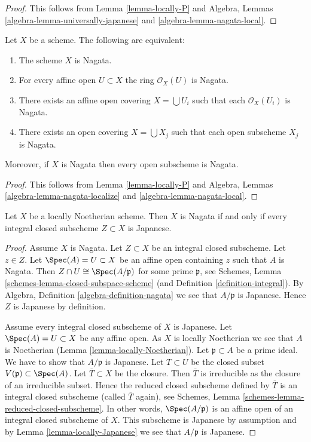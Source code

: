 \begin{proof}
This follows from Lemma \ref{lemma-locally-P} and
Algebra, Lemmas \ref{algebra-lemma-universally-japanese} and
\ref{algebra-lemma-nagata-local}.
\end{proof}

\begin{lemma}
\label{lemma-locally-nagata}
Let $X$ be a scheme. The following are equivalent:
\begin{enumerate}
\item The scheme $X$ is Nagata.
\item For every affine open $U \subset X$ the ring $\mathcal{O}_X(U)$
is Nagata.
\item There exists an affine open covering $X = \bigcup U_i$
such that each $\mathcal{O}_X(U_i)$ is Nagata.
\item There exists an open covering $X = \bigcup X_j$
such that each open subscheme $X_j$ is Nagata.
\end{enumerate}
Moreover, if $X$ is Nagata then every open subscheme is Nagata.
\end{lemma}

\begin{proof}
This follows from Lemma \ref{lemma-locally-P} and
Algebra, Lemmas \ref{algebra-lemma-nagata-localize} and
\ref{algebra-lemma-nagata-local}.
\end{proof}

\begin{lemma}
\label{lemma-characterize-nagata}
Let $X$ be a locally Noetherian scheme.
Then $X$ is Nagata if and only if every integral closed subscheme
$Z \subset X$ is Japanese.
\end{lemma}

\begin{proof}
Assume $X$ is Nagata. Let $Z \subset X$ be an integral closed subscheme.
Let $z \in Z$.
Let $\Spec(A) = U \subset X$ be an affine open containing $z$
such that $A$ is Nagata. Then
$Z \cap U \cong \Spec(A/\mathfrak p)$ for some prime $\mathfrak p$,
see Schemes, Lemma \ref{schemes-lemma-closed-subspace-scheme} (and
Definition \ref{definition-integral}). By
Algebra, Definition \ref{algebra-definition-nagata} we see
that $A/\mathfrak p$ is Japanese. Hence $Z$ is Japanese by definition.

\medskip\noindent
Assume every integral closed subscheme of $X$ is Japanese.
Let $\Spec(A) = U \subset X$ be any affine open.
As $X$ is locally Noetherian we see that $A$ is Noetherian
(Lemma \ref{lemma-locally-Noetherian}). Let $\mathfrak p \subset A$
be a prime ideal. We have to show that $A/\mathfrak p$ is Japanese.
Let $T \subset U$ be the closed subset $V(\mathfrak p) \subset \Spec(A)$.
Let $\overline{T} \subset X$ be the closure. Then $\overline{T}$ is
irreducible as the closure of an irreducible subset. Hence the reduced
closed subscheme defined by $\overline{T}$ is an integral closed
subscheme (called $\overline{T}$ again), see
Schemes, Lemma \ref{schemes-lemma-reduced-closed-subscheme}.
In other words, $\Spec(A/\mathfrak p)$ is an affine
open of an integral closed subscheme of $X$. This subscheme is Japanese
by assumption and by Lemma \ref{lemma-locally-Japanese} we see that
$A/\mathfrak p$ is Japanese.
\end{proof}


